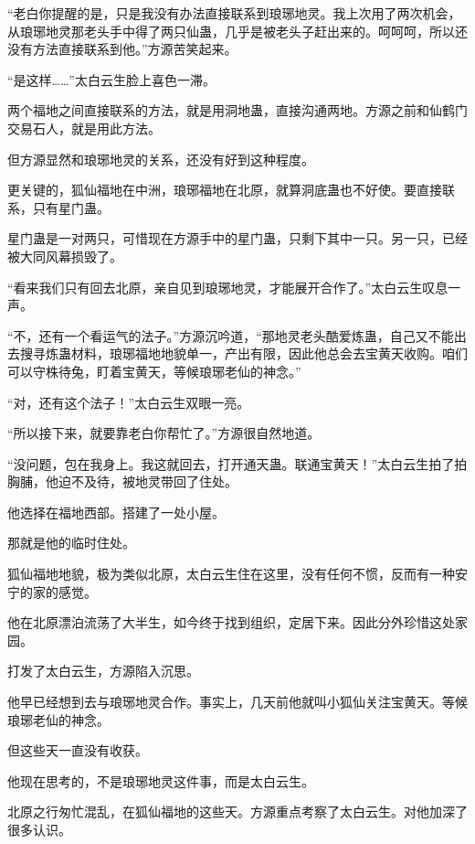 
\begin{this_body}



“老白你提醒的是，只是我没有办法直接联系到琅琊地灵。我上次用了两次机会，从琅琊地灵那老头手中得了两只仙蛊，几乎是被老头子赶出来的。呵呵呵，所以还没有方法直接联系到他。”方源苦笑起来。

“是这样……”太白云生脸上喜色一滞。

两个福地之间直接联系的方法，就是用洞地蛊，直接沟通两地。方源之前和仙鹤门交易石人，就是用此方法。

但方源显然和琅琊地灵的关系，还没有好到这种程度。

更关键的，狐仙福地在中洲，琅琊福地在北原，就算洞底蛊也不好使。要直接联系，只有星门蛊。

星门蛊是一对两只，可惜现在方源手中的星门蛊，只剩下其中一只。另一只，已经被大同风幕损毁了。

“看来我们只有回去北原，亲自见到琅琊地灵，才能展开合作了。”太白云生叹息一声。

“不，还有一个看运气的法子。”方源沉吟道，“那地灵老头酷爱炼蛊，自己又不能出去搜寻炼蛊材料，琅琊福地地貌单一，产出有限，因此他总会去宝黄天收购。咱们可以守株待兔，盯着宝黄天，等候琅琊老仙的神念。”

“对，还有这个法子！”太白云生双眼一亮。

“所以接下来，就要靠老白你帮忙了。”方源很自然地道。

“没问题，包在我身上。我这就回去，打开通天蛊。联通宝黄天！”太白云生拍了拍胸脯，他迫不及待，被地灵带回了住处。

他选择在福地西部。搭建了一处小屋。

那就是他的临时住处。

狐仙福地地貌，极为类似北原，太白云生住在这里，没有任何不惯，反而有一种安宁的家的感觉。

他在北原漂泊流荡了大半生，如今终于找到组织，定居下来。因此分外珍惜这处家园。

打发了太白云生，方源陷入沉思。

他早已经想到去与琅琊地灵合作。事实上，几天前他就叫小狐仙关注宝黄天。等候琅琊老仙的神念。

但这些天一直没有收获。

他现在思考的，不是琅琊地灵这件事，而是太白云生。

北原之行匆忙混乱，在狐仙福地的这些天。方源重点考察了太白云生。对他加深了很多认识。


\end{this_body}
